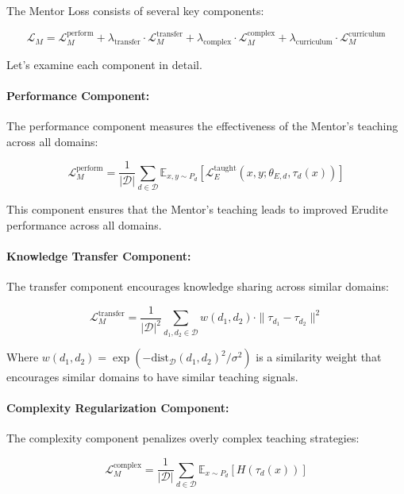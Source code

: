 The Mentor Loss consists of several key components:

\begin{equation}
\mathcal{L}_M = \mathcal{L}_M^{\text{perform}} + \lambda_{\text{transfer}} \cdot \mathcal{L}_M^{\text{transfer}} + \lambda_{\text{complex}} \cdot \mathcal{L}_M^{\text{complex}} + \lambda_{\text{curriculum}} \cdot \mathcal{L}_M^{\text{curriculum}}
\end{equation}

Let's examine each component in detail.

\paragraph{Performance Component:}
The performance component measures the effectiveness of the Mentor's teaching across all domains:

\begin{equation}
\mathcal{L}_M^{\text{perform}} = \frac{1}{|\mathcal{D}|} \sum_{d \in \mathcal{D}} \mathbb{E}_{x,y \sim P_d} [\mathcal{L}_{E}^{\text{taught}}(x, y; \theta_{E,d}, \tau_d(x))]
\end{equation}

This component ensures that the Mentor's teaching leads to improved Erudite performance across all domains.

\paragraph{Knowledge Transfer Component:}
The transfer component encourages knowledge sharing across similar domains:

\begin{equation}
\mathcal{L}_M^{\text{transfer}} = \frac{1}{|\mathcal{D}|^2} \sum_{d_1, d_2 \in \mathcal{D}} w(d_1, d_2) \cdot \|\tau_{d_1} - \tau_{d_2}\|^2
\end{equation}

Where $w(d_1, d_2) = \exp(-\text{dist}_{\mathcal{D}}(d_1, d_2)^2 / \sigma^2)$ is a similarity weight that encourages similar domains to have similar teaching signals.

\paragraph{Complexity Regularization Component:}
The complexity component penalizes overly complex teaching strategies:

\begin{equation}
\mathcal{L}_M^{\text{complex}} = \frac{1}{|\mathcal{D}|} \sum_{d \in \mathcal{D}} \mathbb{E}_{x \sim P_d} [H(\tau_d(x))]
\end{equation}

